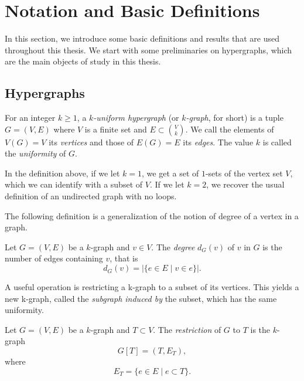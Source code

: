 \section{Notation and Basic Definitions}\label{sec:preliminaries}
In this section, we introduce some basic definitions and results that are used throughout this thesis.
We start with some preliminaries on hypergraphs, which are the main objects of study in this thesis.

\subsection{Hypergraphs}\label{subsec:hypergraphs}

\begin{definition}

    For an integer $k \geq 1$, a \emph{$k$-uniform hypergraph} (or \emph{$k$-graph}, for short)
    is a tuple $G = (V, E)$ where $V$ is a finite set
    and $E \subset \binom{V}{k}$.
    We call the elements of $V(G) = V$ its \emph{vertices}
    and those of $E(G) = E$ its \emph{edges}.
    The value $k$ is called the \emph{uniformity} of $G$.
\end{definition}

\begin{remark}
    In the definition above, if we let $k=1$, we get a set of $1$-sets of the vertex set $V$,
    which we can identify with a subset of $V$.
    If we let $k=2$, we recover the usual definition of an undirected graph with no loops.
\end{remark}

The following definition is a generalization of the notion of degree
of a vertex in a graph.

\begin{definition}
    Let $G = (V, E)$ be a $k$-graph and $v \in V$.
    The \emph{degree} $d_G(v)$ of $v$ in $G$
    is the number of edges containing $v$, that is
    \[
        d_G(v) = |\{e \in E \mid v \in e\}|.
    \]
\end{definition}

A useful operation is restricting a k-graph to a subset of its vertices.
This yields a new k-graph, called the \emph{subgraph induced by} the subset, which has the same uniformity.

\begin{definition}

    \label{def:restriction}
    Let $G = (V, E)$ be a $k$-graph and $T \subset V$.
    The \emph{restriction} of $G$ to $T$ is the $k$-graph
    \[
        G[T] = (T, E_T),
    \]
    where
    \[E_T = \{e \in E \mid e \subset T\}.\]
\end{definition}

